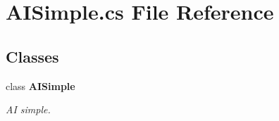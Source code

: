 \section{A\+I\+Simple.\+cs File Reference}
\label{_a_i_simple_8cs}
\subsection*{Classes}
\begin{DoxyCompactItemize}
\item 
class {\bf A\+I\+Simple}
\begin{DoxyCompactList}\small\item\em AI simple. \end{DoxyCompactList}\end{DoxyCompactItemize}
